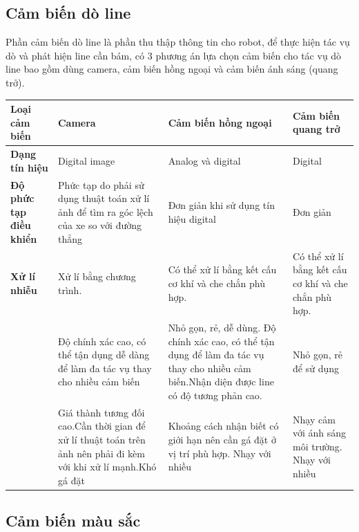     \subsection{Cảm biến dò line}
    \hspace*{0.6cm} Phần cảm biến dò line là phần thu thập thông tin cho robot, để thực hiện tác vụ dò và
    phát hiện line cần bám, có 3 phương án lựa chọn cảm biến cho tác vụ dò line bao gồm dùng camera, cảm
    biến hồng ngoại và cảm biến ánh sáng (quang trở).
    \begin{table}[h]
        \centering
        \begin{tabular}{|>{\raggedright\arraybackslash}p{2.5cm}|>{\raggedright\arraybackslash}p{3cm}|>{\raggedright\arraybackslash}p{4cm}|>{\raggedright\arraybackslash}p{3cm}|}
        \hline
        \textbf{Loại cảm biến} & \textbf{Camera} & \textbf{Cảm biến hồng ngoại} & \textbf{Cảm biến quang trở} \\
        \hline
        \textbf{Dạng tín hiệu} & Digital image & Analog và digital & Digital \\
        \hline
        \textbf{Độ phức tạp điều khiển} & Phức tạp do phải sử dụng thuật toán xử lí ảnh để tìm ra góc lệch của xe so với đường thẳng & Đơn giản khi sử dụng tín hiệu digital & Đơn giản \\
        \hline
        \textbf{Xử lí nhiễu} & Xử lí bằng chương trình. & Có thể xử lí bằng kết cấu cơ khí và che chắn phù hợp. & Có thể xử lí bằng kết cấu cơ khí và che chắn phù hợp. \\
        \hline
        \multirow{3}{*}{\textbf{Ưu điểm}} & Độ chính xác cao, có thể tận dụng dễ dàng để làm đa tác vụ thay cho nhiều cảm biến & Nhỏ gọn, rẻ, dễ dùng. Độ chính xác cao, có thể tận dụng để làm đa tác vụ thay cho nhiều cảm biến.\newline Nhận diện được line có độ tương phản cao. & Nhỏ gọn, rẻ để sử dụng \\
        \hline
        \multirow{3}{*}{\textbf{Nhược điểm}} & Giá thành tương đối cao.\newline Cần thời gian để xử lí thuật toán trên ảnh nên phải đi kèm với khi xử lí mạnh.\newline Khó gá đặt & Khoảng cách nhận biết có giới hạn nên cần gá đặt ở vị trí phù hợp. \newline Nhạy với nhiều & Nhạy cảm với ánh sáng môi trường. \newline Nhạy với nhiều \\
        \hline
        \end{tabular}
    \end{table}


    \subsection{Cảm biến màu sắc}

    